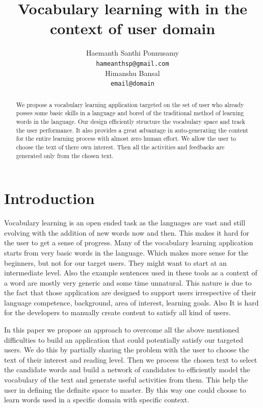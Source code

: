\documentclass[11pt,a4paper]{article}
\title{Vocabulary learning with in the context of user domain}
\author{Haemanth Santhi Ponnusamy \\
  {\tt hameanthsp@gmail.com} \\\And
  Himanshu Bansal \\
  {\tt email@domain}}
\date{}
\begin{document}
\maketitle
\begin{abstract}
  We propose a vocabulary learning application targeted on the set of user
  who already posses some basic skills in a language and bored of the
  traditional method of learning words in the language. Our design 
  efficiently structure the vocabulary space and track the user performance.
  It also provides a great advantage in auto-generating the content
  for the entire learning process with almost zero human effort. We allow the
  user to choose the text of there own interest. Then all the activities and
  feedbacks are generated only from the chosen text.

\end{abstract}

\section{Introduction}
Vocabulary learning is an open ended task as the languages are vast and still
evolving with the addition of new words now and then. This makes it hard for the
user to get a sense of progress. Many of the vocabulary learning application 
starts from very basic words in the language. Which makes more sense for the 
beginners, but not for our target users. They might want to start at an
intermediate level. Also the example sentences used in these tools as a context
of a word are mostly very generic and some time unnatural. This nature is due to the
fact that those application are designed to support users irrespective of their
language competence, background, area of interest, learning goals. Also It is
hard for the developers to manually create content to satisfy all kind of users.

In this paper we propose an approach to overcome all the above mentioned
difficulties to build an application that could potentially satisfy our targeted
users. We do this by partially sharing the problem with the user to choose the 
text of their interest and reading level. Then we process the chosen text to
select the candidate words and build a network of candidates to efficiently model
the vocabulary of the text and generate useful activities from them. This help
the user in defining the definite space to master. By this way one
could choose to learn words used in a specific domain with specific context.
\end{document}
